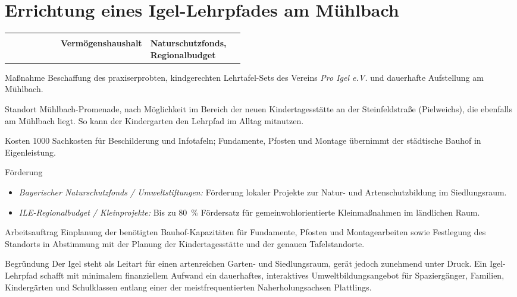 \documentclass[11pt, a4paper]{article}
\makeatletter
\newcommand{\rubrik}[1]{{\small\bfseries\color{GruenAccent}\textls[80]{\MakeUppercase{#1}}}}
\newcommand{\kennzahl}[1]{\leavevmode{\scriptsize\color{Grau}\textls[60]{\MakeUppercase{#1}}}}
\newcommand{\massnahme}[3]{%
  \rubrik{#1}\par\nobreak\vspace{1mm}%
  \section{#2}\label{#3}}
\newcommand{\eckdaten}[3]{%
  \begin{tcolorbox}[enhanced, colback=GruenLight, frame hidden, arc=1.5mm,
      left=5mm, right=5mm, top=2.5mm, bottom=2.5mm, before skip=0pt, after skip=5mm]
    \begin{tabularx}{\linewidth}{@{}p{0.22\linewidth} p{0.24\linewidth} >{\raggedright\arraybackslash}X@{}}
      \kennzahl{Ansatz 2027} & \kennzahl{Haushalt} & \kennzahl{Förderung / Finanzierung} \\[0.5mm]
      \leavevmode{\Large\bfseries\color{GruenPrimary}#1} & \bfseries #2 & \bfseries #3
    \end{tabularx}
  \end{tcolorbox}}
\makeatother
\begin{document}

\massnahme{Umweltbildung}{Errichtung eines Igel-Lehrpfades am Mühlbach}{m:igel}

\eckdaten{\qty{1000}{\EUR}}{Vermögenshaushalt}{Naturschutzfonds, Regionalbudget}

\begin{steckbrief}
  \item[Maßnahme] Beschaffung des praxiserprobten, kindgerechten Lehrtafel-Sets des Vereins \textit{Pro Igel e.V.} und dauerhafte Aufstellung am Mühlbach.
  \item[Standort] Mühlbach-Promenade, nach Möglichkeit im Bereich der neuen Kindertagesstätte an der Steinfeldstraße (Pielweichs), die ebenfalls am Mühlbach liegt. So kann der Kindergarten den Lehrpfad im Alltag mitnutzen.
  \item[Kosten] \qty{1000}{\EUR} Sachkosten für Beschilderung und Infotafeln; Fundamente, Pfosten und Montage übernimmt der städtische Bauhof in Eigenleistung.
  \item[Förderung] \begin{itemize}
      \item \textit{Bayerischer Naturschutzfonds / Umweltstiftungen:} Förderung lokaler Projekte zur Natur- und Artenschutzbildung im Siedlungsraum.
      \item \textit{ILE-Regionalbudget / Kleinprojekte:} Bis zu \SI{80}{\percent} Fördersatz für gemeinwohlorientierte Kleinmaßnahmen im ländlichen Raum.
    \end{itemize}
  \item[Arbeitsauftrag] Einplanung der benötigten Bauhof-Kapazitäten für Fundamente, Pfosten und Montagearbeiten sowie Festlegung des Standorts in Abstimmung mit der Planung der Kindertagesstätte und der genauen Tafelstandorte.
  \item[Begründung] Der Igel steht als Leitart für einen artenreichen Garten- und Siedlungsraum, gerät jedoch zunehmend unter Druck. Ein Igel-Lehrpfad schafft mit minimalem finanziellem Aufwand ein dauerhaftes, interaktives Umweltbildungsangebot für Spaziergänger, Familien, Kindergärten und Schulklassen entlang einer der meistfrequentierten Naherholungsachsen Plattlings.
\end{steckbrief}

\clearpage

\end{document}
